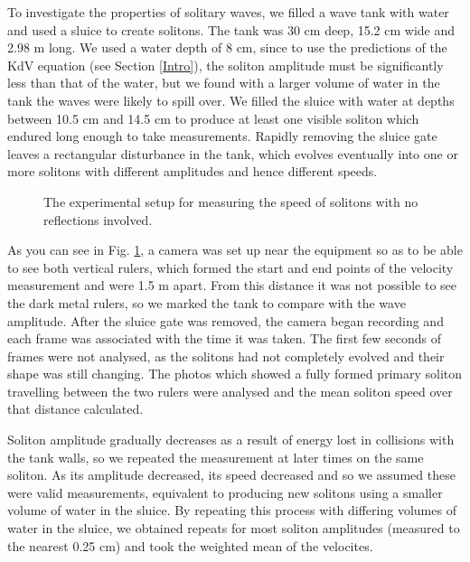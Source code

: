 \documentclass[10pt, twocolumn]{revtex4}    %
\begin{document}



To investigate the properties of solitary waves, we filled a wave tank with water and used a sluice to create solitons. The tank was 30 cm deep, 15.2 cm wide and 2.98 m long. We used a water depth of 8 cm, since to use the predictions of the KdV equation (see Section \ref{Intro}), the soliton amplitude must be significantly less than that of the water, but we found with a larger volume of water in the tank the waves were likely to spill over. We filled the sluice with water at depths between 10.5 cm and 14.5 cm to produce at least one visible soliton which endured long enough to take measurements. Rapidly removing the sluice gate leaves a rectangular disturbance in the tank, which evolves eventually into one or more solitons with different amplitudes and hence different speeds. 

\begin{figure}[h]
\caption{The experimental setup for measuring the speed of solitons with no reflections involved.}
\label{Diagram1}
\end{figure}

As you can see in Fig. \ref{Diagram1}, a camera was set up near the equipment so as to be able to see both vertical rulers, which formed the start and end points of the velocity measurement and were 1.5 m apart. From this distance it was not possible to see the dark metal rulers, so we marked the tank to compare with the wave amplitude. After the sluice gate was removed, the camera began recording and each frame was associated with the time it was taken. The first few seconds of frames were not analysed, as the solitons had not completely evolved and their shape was still changing. The photos which showed a fully formed primary soliton travelling between the two rulers were analysed and the mean soliton speed over that distance calculated.

Soliton amplitude gradually decreases as a result of energy lost in collisions with the tank walls, so we repeated the measurement at later times on the same soliton. As its amplitude decreased, its speed decreased and so we assumed these were valid measurements, equivalent to producing new solitons using a smaller volume of water in the sluice. By repeating this process with differing volumes of water in the sluice, we obtained repeats for most soliton amplitudes (measured to the nearest 0.25 cm) and took the weighted mean of the velocites.
\end{document}
